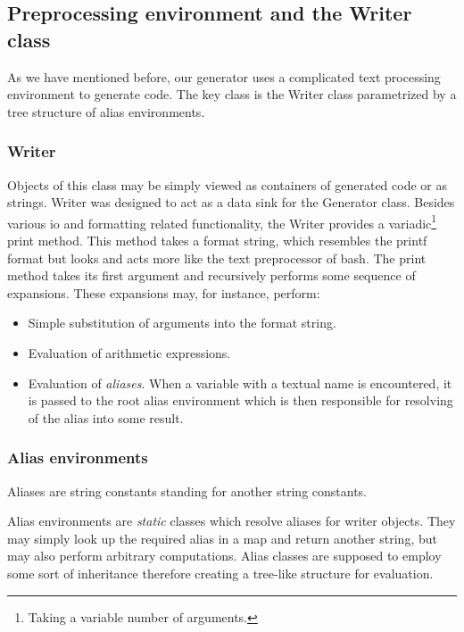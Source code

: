 \subsection*{Preprocessing environment and the Writer class}

As we have mentioned before, our generator uses a complicated text processing environment to generate code. The key class is the Writer class parametrized by a tree structure of alias environments. 

\subsubsection{Writer}
Objects of this class may be simply viewed as containers of generated code or as strings. Writer was designed to act as a data sink for the Generator class. Besides various io and formatting related functionality, the Writer provides a variadic\footnote{Taking a variable number of arguments.} print method. This method takes a format string, which resembles the printf format but looks and acts more like the text preprocessor of bash. The print method takes its first argument and recursively performs some sequence of expansions. These expansions may, for instance, perform:
\begin{itemize}
  \item Simple substitution of arguments into the format string.
  \item Evaluation of arithmetic expressions. 
  \item Evaluation of \emph{aliases}. When a variable with a textual name is encountered, it is passed to the root alias environment which is then responsible for resolving of the alias into some result.
\end{itemize}

\subsubsection{Alias environments}
Aliases are string constants standing for another string constants.

Alias environments are \emph{static} classes which resolve aliases for writer objects. They may simply look up the required alias in a map and return another string, but may also perform arbitrary computations. Alias classes are supposed to employ some sort of inheritance therefore creating a tree-like structure for evaluation.


